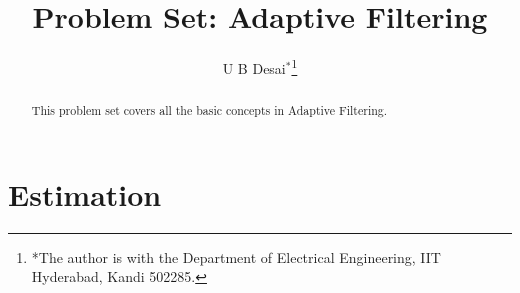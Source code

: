 \documentclass[journal,12pt,twocolumn]{IEEEtran}
\begin{document}

\makeatletter
{}
\makeatother

\let\StandardTheFigure\thefigure
\let\StandardTheTable\thetable
\renewcommand{\thetable}{\theproblem}





\title{ 
Problem Set: Adaptive Filtering
}
\author{U B Desai$^{*}$\thanks{*The author is with the Department of Electrical Engineering, IIT Hyderabad, Kandi 502285.}}
\maketitle

\begin{abstract}
This problem set covers all the
basic concepts in Adaptive Filtering.
\end{abstract}


\section{Estimation}
\end{document}
